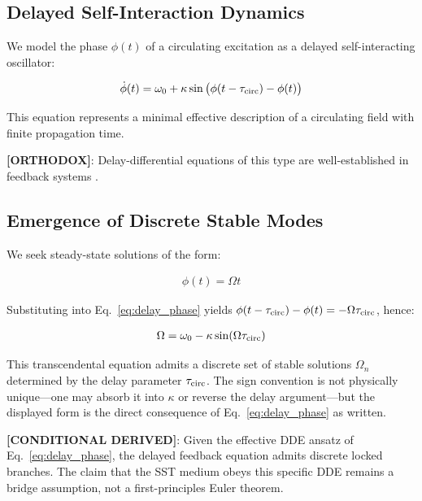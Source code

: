 \documentclass[11pt]{article}
\theoremstyle{definition}
\theoremstyle{plain}
\theoremstyle{remark}
\begin{document}
    \subsection{Delayed Self-Interaction Dynamics}
        
        We model the phase $\phi(t)$ of a circulating excitation as a delayed self-interacting oscillator:
        
        \begin{align}
            \dot{\phi}(t) = \omega_0 + \kappa \sin\big(\phi(t - \tau_{\rm circ}) - \phi(t)\big)
            \label{eq:delay_phase}
        \end{align}
        
        This equation represents a minimal effective description of a circulating field with finite propagation time.
        
        \textbf{[ORTHODOX]}: Delay-differential equations of this type are well-established in feedback systems \cite{SST_delay_basic}.
    
    \subsection{Emergence of Discrete Stable Modes}
        
        We seek steady-state solutions of the form:
        
        \begin{align}
            \phi(t) = \Omega t
        \end{align}
        
        Substituting into Eq.~\ref{eq:delay_phase} yields $\phi(t-\tau_{\rm circ})-\phi(t)=-\Omega\tau_{\rm circ}$, hence:
        
        \begin{align}
            \Omega = \omega_0 - \kappa \sin(\Omega \tau_{\rm circ})
            \label{eq:mode_condition}
        \end{align}
        
        This transcendental equation admits a discrete set of stable solutions $\Omega_n$ determined by the delay parameter $\tau_{\rm circ}$. The sign convention is not physically unique---one may absorb it into $\kappa$ or reverse the delay argument---but the displayed form is the direct consequence of Eq.~\eqref{eq:delay_phase} as written.
        
        \textbf{[CONDITIONAL DERIVED]}: Given the effective DDE ansatz of Eq.~\eqref{eq:delay_phase}, the delayed feedback equation admits discrete locked branches. The claim that the SST medium obeys this specific DDE remains a bridge assumption, not a first-principles Euler theorem.
    
\end{document}
